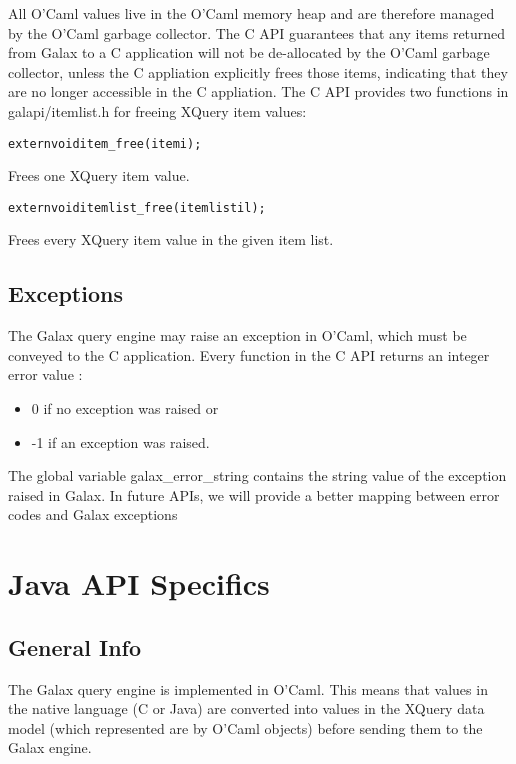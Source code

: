   All O'Caml values live in the O'Caml memory heap and are therefore
  managed by the O'Caml garbage collector.  The C API guarantees that
  any items returned from Galax to a C application will not be
  de-allocated by the O'Caml garbage collector, unless the C
  appliation explicitly frees those items, indicating that they are no
  longer accessible in the C appliation.  The C API provides two
  functions in galapi/itemlist.h for freeing XQuery item values: 
  
\begin{alltt}
extern void item\_free(item i);
\end{alltt}
      Frees one XQuery item value.
 
\begin{alltt}
extern void itemlist\_free(itemlist il);
\end{alltt}
      Frees every XQuery item value in the given item list.
  
\subsection{Exceptions}
  The Galax query engine may raise an exception in O'Caml, which must
  be conveyed to the C application.  Every function in the C API
  returns an integer error value : 
\begin{itemize}
\item     0 if no exception was raised or
\item    -1 if an exception was raised.
\end{itemize}

  The global variable galax\_error\_string contains the string value of
  the exception raised in Galax.  In future APIs, we will provide a
  better mapping between error codes and Galax exceptions

\section{Java API Specifics}

\subsection{General Info}

  The Galax query engine is implemented in O'Caml.  This means that
  values in the native language (C or Java) are converted into values
  in the XQuery data model (which represented are by O'Caml objects)
  before sending them to the Galax engine.


